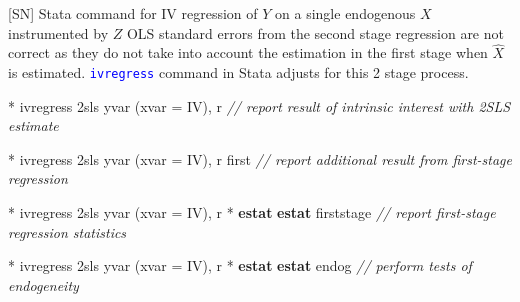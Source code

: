 \documentclass[
  10pt,
  ignorenonframetext,
]{beamer}
\newenvironment{Shaded}{\begin{snugshade}}{\end{snugshade}}
\newcommand{\CommentTok}[1]{\textcolor[rgb]{0.56,0.35,0.01}{\textit{#1}}}
\newcommand{\FunctionTok}[1]{\textcolor[rgb]{0.00,0.00,0.00}{#1}}
\newcommand{\KeywordTok}[1]{\textcolor[rgb]{0.13,0.29,0.53}{\textbf{#1}}}
\newcommand{\NormalTok}[1]{#1}
\begin{document}
\begin{frame}[fragile]{{[}SN{]} Stata command for IV regression of \(Y\)
on a single endogenous \(X\) instrumented by \(Z\)}
\protect\hypertarget{sn-stata-command-for-iv-regression-of-y-on-a-single-endogenous-x-instrumented-by-z}{}
OLS standard errors from the second stage regression are not correct as
they do not take into account the estimation in the first stage when
\(\hat{X}\) is estimated. \textcolor{blue}{\texttt{ivregress}} command
in Stata adjusts for this 2 stage process.

\small

\begin{Shaded}
\begin{Highlighting}[]
\NormalTok{* ivregress 2sls yvar (xvar = IV), }\FunctionTok{r}
\CommentTok{// report result of intrinsic interest with 2SLS estimate}
\end{Highlighting}
\end{Shaded}

\begin{Shaded}
\begin{Highlighting}[]
\NormalTok{* ivregress 2sls yvar (xvar = IV), }\FunctionTok{r}\NormalTok{ first}
\CommentTok{// report additional result from first{-}stage regression}
\end{Highlighting}
\end{Shaded}

\begin{Shaded}
\begin{Highlighting}[]
\NormalTok{* ivregress 2sls yvar (xvar = IV), }\FunctionTok{r}
\NormalTok{* }\KeywordTok{estat} \KeywordTok{estat}\NormalTok{ firststage}
\CommentTok{// report first{-}stage regression statistics}
\end{Highlighting}
\end{Shaded}

\begin{Shaded}
\begin{Highlighting}[]
\NormalTok{* ivregress 2sls yvar (xvar = IV), }\FunctionTok{r}
\NormalTok{* }\KeywordTok{estat} \KeywordTok{estat}\NormalTok{ endog}
\CommentTok{// perform tests of endogeneity}
\end{Highlighting}
\end{Shaded}
\end{frame}
\end{document}
